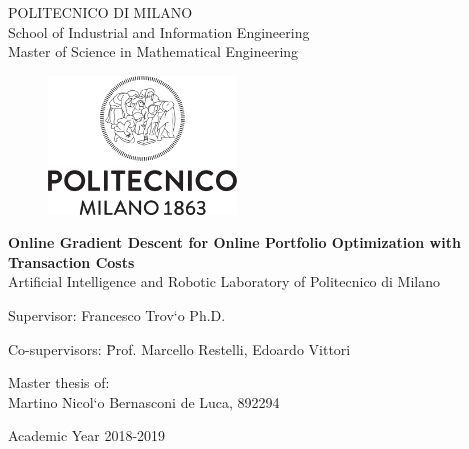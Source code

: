 \thispagestyle{empty}
\vspace*{-1.5cm}
 \bfseries{
\begin{center}
  \large
  POLITECNICO DI MILANO\\
  \normalsize
  School of Industrial and Information Engineering\\
  Master of Science in Mathematical Engineering\\
  \begin{figure}[htbp]
    \begin{center}
      \includegraphics[width=5cm]{./img/logo/Logo_Politecnico_Milano.png}
    \end{center}
  \end{figure}
  \vspace*{0.1cm} \LARGE


    \textbf{Online Gradient Descent for Online Portfolio Optimization with Transaction Costs}\\


  \vspace*{.75truecm} \large
  Artificial Intelligence and Robotic Laboratory \newline of Politecnico di Milano
\end{center}
\vspace*{2.0cm} \large
\begin{flushleft}


  Supervisor: Francesco Trov\a`{o} Ph.D. \\

  \begin{tabbing}  
      Co-supervisors: \= Prof. Marcello Restelli,
      Edoardo Vittori
  \end{tabbing}
\end{flushleft}
\vspace*{1.0cm}
\begin{flushright}


  Master thesis of:\\ Martino Nicol\a`{o} Bernasconi de Luca, 892294\\


\end{flushright}
\vspace*{0.8cm}
\begin{center}

  Academic Year 2018-2019 %
\end{center} \clearpage
}
